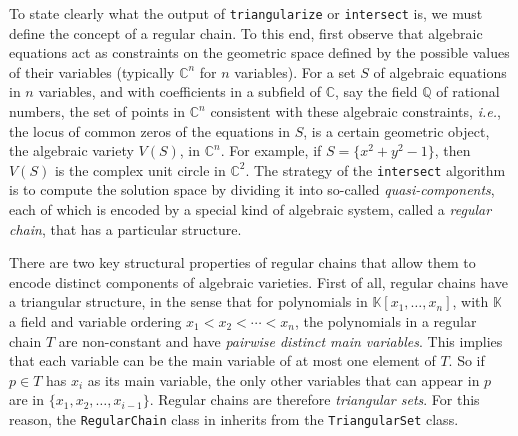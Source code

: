 To state clearly what the output of \texttt{triangularize} or
\texttt{intersect} is, we must define the concept of a regular
chain. To this end, first observe that algebraic equations act as
constraints on the geometric space defined by the possible values of
their variables (typically $\mathbb{C}^n$ for $n$ variables).
For a set $S$ of algebraic equations in $n$ variables, and with
coefficients in a subfield of $\mathbb{C}$, say the field $\mathbb{Q}$
of rational numbers, the set of points in $\mathbb{C}^n$ consistent
with these algebraic constraints, \emph{i.e.}, the locus of common
zeros of the equations in $S$, is a certain geometric object, the
algebraic variety $V(S)$, in $\mathbb{C}^n$. For example, if
$S=\{x^2+y^2-1\}$, then $V(S)$ is the complex unit circle in
$\mathbb{C}^2$. The strategy of the \texttt{intersect} algorithm is to
compute the solution space by dividing it into so-called
\emph{quasi-components}, 
each of which is encoded by a
special kind of algebraic system, called a \emph{regular chain}, that
has a particular structure.

There are two key structural properties of regular chains that allow
them to encode distinct components of algebraic varieties. First of
all, regular chains have a triangular structure, in the sense that for
polynomials in $\mathbb{K}[x_1,\ldots,x_n]$, with $\mathbb{K}$ a field
and variable ordering $x_1<x_2<\cdots<x_n$, the polynomials in a
regular chain $T$ are non-constant and have \emph{pairwise distinct
  main variables}. This implies that each variable can be the main
variable of at most one element of $T$. So if $p\in T$ has $x_i$ as
its main variable, the only other variables that can appear in $p$ are
in $\{x_1,x_2,\ldots,x_{i-1}\}$. Regular chains are therefore
\emph{triangular sets}. For this reason, the \texttt{RegularChain}
class in \bpas{} inherits from the \texttt{TriangularSet} class.


